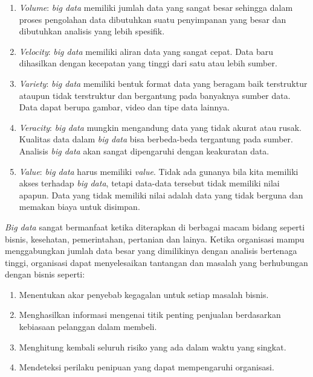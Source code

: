 \begin{enumerate}

\item {\it Volume}: {\it big data} memiliki jumlah data yang sangat besar sehingga dalam proses pengolahan data dibutuhkan suatu penyimpanan yang besar dan dibutuhkan analisis yang lebih spesifik.

\item {\it Velocity}: {\it big data} memiliki aliran data yang sangat cepat. Data baru dihasilkan dengan kecepatan yang tinggi dari satu atau lebih sumber. 

\item {\it Variety}: {\it big data} memiliki bentuk format data yang beragam baik terstruktur ataupun tidak terstruktur dan bergantung pada banyaknya sumber data. Data dapat berupa gambar, video dan tipe data lainnya.

\item {\it Veracity}: {\it big data} mungkin mengandung data yang tidak akurat atau rusak. Kualitas  data dalam {\it big data} bisa berbeda-beda tergantung pada sumber. Analisis {\it big data} akan sangat dipengaruhi dengan keakuratan data.

\item {\it Value}: {\it big data} harus memiliki \textit{value}. Tidak ada gunanya bila kita memiliki akses terhadap {\it big data}, tetapi data-data tersebut tidak memiliki nilai apapun. Data yang tidak memiliki nilai adalah data yang tidak berguna dan memakan biaya untuk disimpan.

\end{enumerate}

{\it Big data} sangat bermanfaat ketika diterapkan di berbagai macam bidang seperti bisnis, kesehatan, pemerintahan, pertanian dan lainya. Ketika organisasi mampu menggabungkan jumlah data besar yang dimilikinya dengan analisis bertenaga tinggi, organisasi dapat menyelesaikan tantangan dan masalah yang berhubungan dengan bisnis seperti:

\begin{enumerate}

\item Menentukan akar penyebab kegagalan untuk setiap masalah bisnis.

\item Menghasilkan informasi mengenai titik penting penjualan berdasarkan kebiasaan pelanggan dalam membeli.

\item Menghitung kembali seluruh risiko yang ada dalam waktu yang singkat.

\item Mendeteksi perilaku penipuan yang dapat mempengaruhi organisasi.

\end{enumerate}


